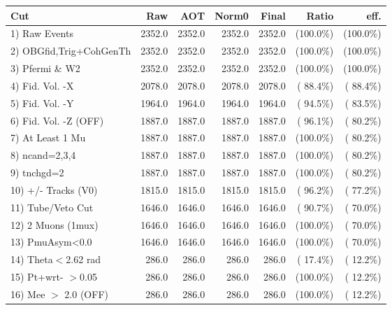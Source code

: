  \begin{table}[h!]\centering
 \begin{tabular}{||l||r|r|r|r|r|r||}
 \hline
 \hline
 Cut & Raw & AOT & Norm0 & Final & Ratio & eff.       \\
 \hline
  1) Raw Events           &       2352.0 &       2352.0 &       2352.0 &       2352.0 & (100.0\%) & (100.0\%) \\
  2) OBGfid,Trig+CohGenTh &       2352.0 &       2352.0 &       2352.0 &       2352.0 & (100.0\%) & (100.0\%) \\
  3) Pfermi \& W2         &       2352.0 &       2352.0 &       2352.0 &       2352.0 & (100.0\%) & (100.0\%) \\
  4) Fid. Vol. -X         &       2078.0 &       2078.0 &       2078.0 &       2078.0 & ( 88.4\%) & ( 88.4\%) \\
  5) Fid. Vol. -Y         &       1964.0 &       1964.0 &       1964.0 &       1964.0 & ( 94.5\%) & ( 83.5\%) \\
  6) Fid. Vol. -Z (OFF)   &       1887.0 &       1887.0 &       1887.0 &       1887.0 & ( 96.1\%) & ( 80.2\%) \\
  7) At Least 1 Mu        &       1887.0 &       1887.0 &       1887.0 &       1887.0 & (100.0\%) & ( 80.2\%) \\
  8) ncand=2,3,4          &       1887.0 &       1887.0 &       1887.0 &       1887.0 & (100.0\%) & ( 80.2\%) \\
  9) tnchgd=2             &       1887.0 &       1887.0 &       1887.0 &       1887.0 & (100.0\%) & ( 80.2\%) \\
 10) +/- Tracks (V0)      &       1815.0 &       1815.0 &       1815.0 &       1815.0 & ( 96.2\%) & ( 77.2\%) \\
 11) Tube/Veto Cut        &       1646.0 &       1646.0 &       1646.0 &       1646.0 & ( 90.7\%) & ( 70.0\%) \\
 12) 2 Muons (1mux)       &       1646.0 &       1646.0 &       1646.0 &       1646.0 & (100.0\%) & ( 70.0\%) \\
 13) PmuAsym<0.0          &       1646.0 &       1646.0 &       1646.0 &       1646.0 & (100.0\%) & ( 70.0\%) \\
 14) Theta$<$2.62 rad     &        286.0 &        286.0 &        286.0 &        286.0 & ( 17.4\%) & ( 12.2\%) \\
 15) Pt+wrt- $>$0.05      &        286.0 &        286.0 &        286.0 &        286.0 & (100.0\%) & ( 12.2\%) \\
 16) Mee $>$ 2.0  (OFF)   &        286.0 &        286.0 &        286.0 &        286.0 & (100.0\%) & ( 12.2\%) \\

\end{tabular}
\end{table}
